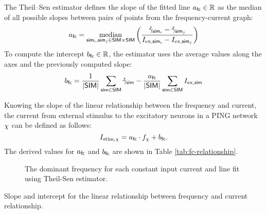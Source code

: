 The Theil–Sen estimator defines the slope of the fitted line $a_\mathsf{fc} \in \mathbb{R}$ as the median of all possible slopes between pairs of points from the frequency-current graph:
\begin{equation}
    a_\mathsf{fc} = \operatorname*{median}_{
        \mathsf{sim}_i, \mathsf{sim}_j \in \mathsf{SIM} \times \mathsf{SIM}
    } \left( 
        \frac{
            \mathring{\gamma}_{\mathsf{sim}_i} - \mathring{\gamma}_{\mathsf{sim}_j}
        }{
            I_{\mathrm{ex}, \mathsf{sim}_i} - I_{\mathrm{ex}, \mathsf{sim}_j}
        } 
    \right)
\end{equation}
To compute the intercept $b_\mathsf{fc} \in \mathbb{R}$, the estimator uses the average values along the axes and the previously computed slope:
\begin{equation}
    b_\mathsf{fc} = 
    \frac{1}{|\mathsf{SIM}|}
    \sum_{\mathsf{sim} \in \mathsf{SIM}}
    \mathring{\gamma}_{\mathsf{sim}}
    -
    \frac{a_\mathsf{fc}}{|\mathsf{SIM}|}
    \sum_{\mathsf{sim} \in \mathsf{SIM}}
    I_{\mathrm{ex}, \mathsf{sim}}
\end{equation}

Knowing the slope of the linear relationship between the frequency and current, the current from external stimulus to the excitatory neurons in a PING network $\chi$ can be defined as follows:
\begin{equation}
    I_{\mathrm{stim}, \chi} = a_\mathsf{fc} \cdot f_\chi + b_\mathsf{fc}.
\end{equation}
The derived values for $a_\mathsf{fc}$ and $b_\mathsf{fc}$ are shown in Table \ref{tab:fc-relationship}.

\begin{figure}[!htp]
    \centering
    \vspace{\baselineskip}
    
    \caption[Frequency-current relationship]{The dominant frequency for each constant input current and line fit using Theil-Sen estimator.}
    \label{fig:fc-relationship}
\end{figure}

\begin{table}[!htp]
    \centering
    
    \caption[Frequency-current relationship parameters]{Slope and intercept for the linear relationship between frequency and current relationship.}
    \label{tab:fc-relationship}
\end{table}